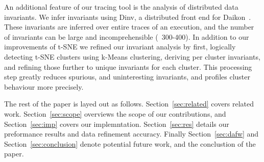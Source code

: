 An additional feature of our tracing tool is the analysis of
distributed data invariants. We infer invariants using Dinv, a
distributed front end for Daikon~\cite{Ernst99dynamicallydiscovering}.
These invariants are inferred over entire traces of an execution, and
the number of invariants can be large and incomprehensible (~300-400).
In addition to our improvements of t-SNE we refined our invariant
analysis by first, logically detecting t-SNE clusters using k-Means
clustering, deriving per cluster invariants, and refining those
further to unique invariants for each cluster. This processing step
greatly reduces spurious, and uninteresting invariants, and profiles
cluster behaviour more precisely.

The rest of the paper is layed out as follows.
Section~\ref{sec:related} covers related work. Section~\ref{sec:scope}
overviews the scope of our contributions, and Section~\ref{sec:imp}
covers our implemntation. Section~\ref{sec:res} details our
preformance results and data refinement accuracy. Finally
Section~\ref{sec:dafw} and Section~\ref{sec:conclusion} denote
potential future work, and the conclustion of the paper.
